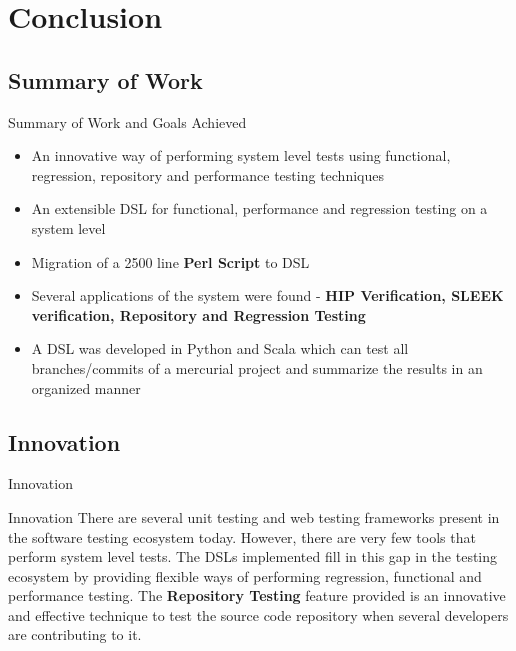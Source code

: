 \section{Conclusion}
\subsection{Summary of Work}
\begin{frame}{Summary of Work and Goals Achieved}
\begin{itemize}
\item An innovative way of performing system level tests using functional, regression, repository and performance testing techniques
\item An extensible DSL for functional, performance and regression testing on a system level
\item Migration of a 2500 line \textbf{Perl Script} to DSL
\item Several applications of the system were found - \textbf{HIP Verification, SLEEK verification, Repository and Regression Testing}
\item A DSL was developed in Python and Scala which can test all branches/commits of a mercurial project and summarize the results in an organized manner
\end{itemize}
\end{frame}

\subsection{Innovation}
\begin{frame}{Innovation}
\begin{block}{Innovation}
There are several unit testing and web testing frameworks present in the software testing ecosystem today. However, there are very few tools that perform system level tests. The DSLs implemented fill in this gap in the testing ecosystem by providing flexible ways of performing regression, functional and performance testing. The \textbf{Repository Testing} feature provided is an innovative and effective technique to test the source code repository when several developers are contributing to it.
\end{block}
\end{frame}

